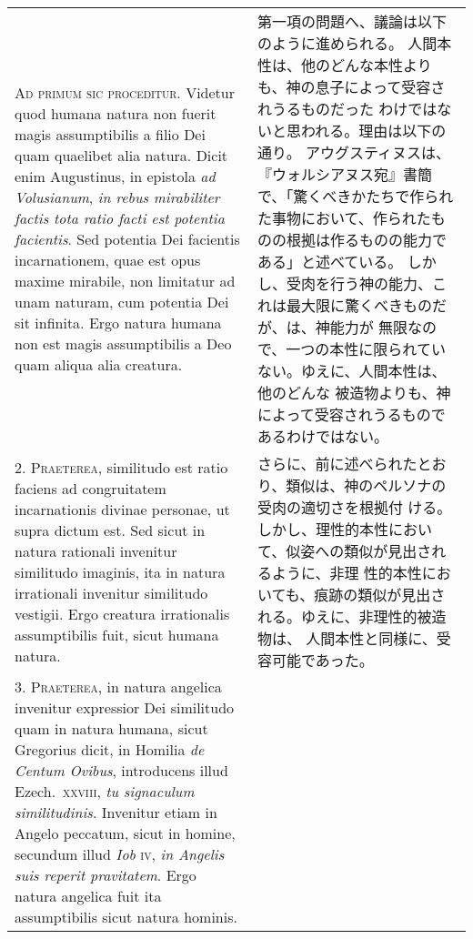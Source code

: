 \documentclass[10pt]{jsarticle} %
\begin{document}
\begin{longtable}{p{21em}p{21em}}

{\Huge A}{\scshape d primum sic proceditur}. Videtur quod humana natura non fuerit magis
assumptibilis a filio Dei quam quaelibet alia natura. Dicit enim
Augustinus, in epistola {\itshape ad Volusianum}, {\itshape in rebus mirabiliter factis tota
ratio facti est potentia facientis}. Sed potentia Dei facientis
incarnationem, quae est opus maxime mirabile, non limitatur ad unam
naturam, cum potentia Dei sit infinita. Ergo natura humana non est magis
assumptibilis a Deo quam aliqua alia creatura.


&

第一項の問題へ、議論は以下のように進められる。
人間本性は、他のどんな本性よりも、神の息子によって受容されうるものだった
 わけではないと思われる。理由は以下の通り。
アウグスティヌスは、『ウォルシアヌス宛』書簡で、「驚くべきかたちで作られ
 た事物において、作られたものの根拠は作るものの能力である」と述べている。
しかし、受肉を行う神の能力、これは最大限に驚くべきものだが、は、神能力が
 無限なので、一つの本性に限られていない。ゆえに、人間本性は、他のどんな
被造物よりも、神によって受容されうるものであるわけではない。



\\



2. {\scshape Praeterea}, similitudo est ratio faciens ad congruitatem incarnationis
divinae personae, ut supra dictum est. Sed sicut in natura rationali
invenitur similitudo imaginis, ita in natura irrationali invenitur
similitudo vestigii. Ergo creatura irrationalis assumptibilis fuit,
sicut humana natura.


&


さらに、前に述べられたとおり、類似は、神のペルソナの受肉の適切さを根拠付
 ける。しかし、理性的本性において、似姿への類似が見出されるように、非理
 性的本性においても、痕跡の類似が見出される。ゆえに、非理性的被造物は、
 人間本性と同様に、受容可能であった。

\\



3. {\scshape Praeterea}, in natura angelica invenitur expressior Dei similitudo quam
in natura humana, sicut Gregorius dicit, in Homilia {\itshape de Centum Ovibus},
introducens illud Ezech.~{\scshape xxviii}, {\itshape tu signaculum similitudinis}. Invenitur
etiam in Angelo peccatum, sicut in homine, secundum illud {\itshape Iob}
 {\scshape iv}, {\itshape in
Angelis suis reperit pravitatem}. Ergo natura angelica fuit ita
assumptibilis sicut natura hominis.



\end{longtable}
\end{document}
